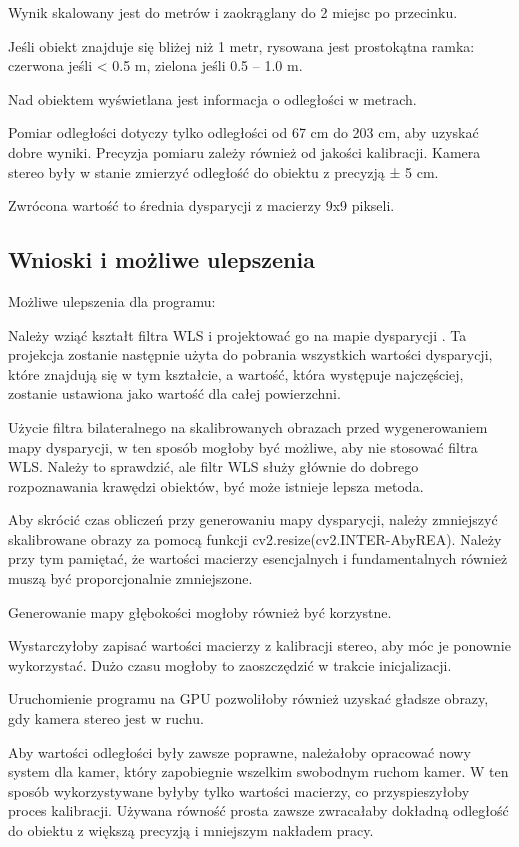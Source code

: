 \documentclass[magisterska]{pracadypl}
\begin{document}
Wynik skalowany jest do metrów i zaokrąglany do 2 miejsc po przecinku.

Jeśli obiekt znajduje się bliżej niż 1 metr, rysowana jest prostokątna ramka: czerwona jeśli < 0.5 m, zielona jeśli 0.5 – 1.0 m.

Nad obiektem wyświetlana jest informacja o odległości w metrach.

Pomiar odległości dotyczy tylko odległości od 67 cm do 203 cm, aby uzyskać dobre wyniki. Precyzja pomiaru zależy również od jakości kalibracji. Kamera stereo były w stanie zmierzyć odległość do obiektu z precyzją ± 5 cm.

Zwrócona wartość to średnia dysparycji z macierzy 9x9 pikseli.

\subsection{Wnioski i możliwe ulepszenia}

Możliwe ulepszenia dla programu:

Należy wziąć kształt filtra WLS i projektować go na mapie dysparycji \cite{rao}. Ta projekcja zostanie następnie użyta do pobrania wszystkich wartości dysparycji, które znajdują się w tym kształcie, a wartość, która występuje najczęściej, zostanie ustawiona jako wartość dla całej powierzchni.

Użycie filtra bilateralnego na skalibrowanych obrazach przed wygenerowaniem mapy dysparycji, w ten sposób mogłoby być możliwe, aby nie stosować filtra WLS. Należy to sprawdzić, ale filtr WLS służy głównie do dobrego rozpoznawania krawędzi obiektów, być może istnieje lepsza metoda.

Aby skrócić czas obliczeń przy generowaniu mapy dysparycji, należy zmniejszyć skalibrowane obrazy za pomocą funkcji cv2.resize(cv2.INTER-AbyREA). Należy przy tym pamiętać, że wartości macierzy esencjalnych i fundamentalnych również muszą być proporcjonalnie zmniejszone.

Generowanie mapy głębokości mogłoby również być korzystne.

Wystarczyłoby zapisać wartości macierzy z kalibracji stereo, aby móc je ponownie wykorzystać. Dużo czasu mogłoby to zaoszczędzić w trakcie inicjalizacji.

Uruchomienie programu na GPU pozwoliłoby również uzyskać gładsze obrazy, gdy kamera stereo jest w ruchu.

Aby wartości odległości były zawsze poprawne, należałoby opracować nowy system dla kamer, który zapobiegnie wszelkim swobodnym ruchom kamer. W ten sposób wykorzystywane byłyby tylko wartości macierzy, co przyspieszyłoby proces kalibracji. Używana równość prosta zawsze zwracałaby dokładną odległość do obiektu z większą precyzją i mniejszym nakładem pracy.
\end{document}
